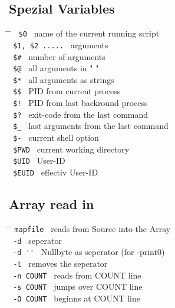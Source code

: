 \documentclass[a4paper,10pt]{article}
\begin{document}
\subsection{Spezial Variables}
\begin{tabbing}
	\= \hspace{30mm} \= \hspace{50mm} \kill
	\> \verb| $0 | \> name of the current running script \\
	\> \verb| $1, $2 ..... | \> arguments \\
	\> \verb| $# | \> number of arguments \\
	\> \verb| $@ | \> all arguments in " " \\
	\> \verb| $* | \> all arguments as strings \\
	\> \verb| $$ | \> PID from current process \\
	\> \verb| $! | \> PID from last backround process \\
	\> \verb| $? | \> exit-code from the last command \\
	\> \verb| $_ | \> last arguments from the last command \\
	\> \verb| $- | \> current shell option \\
	\> \verb| $PWD | \> current working directory \\
	\> \verb| $UID | \> User-ID \\
	\> \verb| $EUID | \> effectiv User-ID \\
\end{tabbing}

\subsection{Array read in}
\begin{tabbing}
	\= \hspace{30mm} \= \hspace{50mm} \kill
	\> \verb|mapfile | \> reads from Source into the Array \\
	\> \verb| -d | \> seperator \\
	\> \verb| -d '' | \> Nullbyte as seperator (for -print0)\\
	\> \verb| -t | \> removes the seperator \\
	\> \verb| -n COUNT | \> reads from COUNT line \\
	\> \verb| -s COUNT | \> jumps over COUNT line \\
	\> \verb| -O COUNT | \> beginns at COUNT line \\
\end{tabbing}
\end{document}
